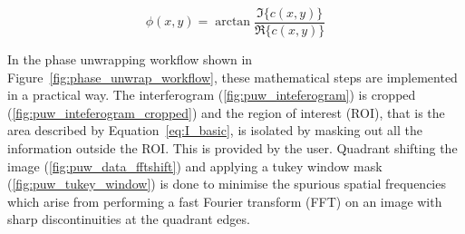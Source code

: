 \begin{equation}\label{eq:phase}
\phi(x,y) = \arctan \frac{\Im\{c(x,y)\}}{\Re\{c(x,y)\}}
\end{equation}

In the phase unwrapping workflow shown in Figure~\ref{fig:phase_unwrap_workflow}, these mathematical steps are implemented in a practical way. The interferogram (\ref{fig:puw_inteferogram}) is cropped (\ref{fig:puw_inteferogram_cropped}) and the region of interest (ROI), that is the area described by Equation~\ref{eq:I_basic}, is isolated by masking out all the information outside the ROI. This is provided by the user. Quadrant shifting the image (\ref{fig:puw_data_fftshift}) and applying a tukey window mask (\ref{fig:puw_tukey_window}) is done to minimise the spurious spatial frequencies which arise from performing a fast Fourier transform (FFT) on an image with sharp discontinuities at the quadrant edges.

